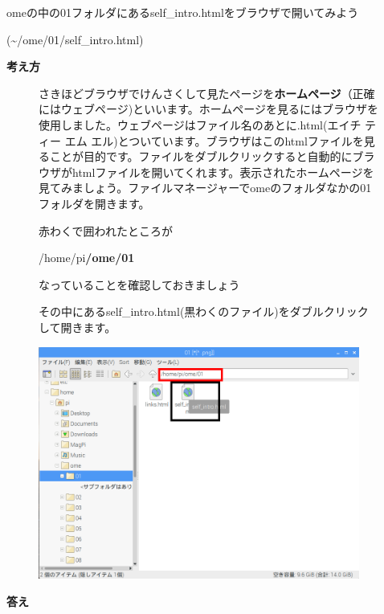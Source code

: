 \documentclass[a4paper,12pt]{jarticle}
\begin{document}
omeの中の01フォルダにあるself\_intro.htmlをブラウザで開いてみよう

(\~{}/ome/01/self\_intro.html)

\textbf{考え方}



\begin{figure}[hb]
\centering
\begin{minipage}{16.576cm}
さきほどブラウザでけんさくして見たページを\textbf{ホームページ}（正確にはウェブページ)といいます。ホームページを見るにはブラウザを使用しました。ウェブページはファイル名のあとに.html(エイチ
ティー エム
エル)とついています。ブラウザはこのhtmlファイルを見ることが目的です。ファイルをダブルクリックすると自動的にブラウザがhtmlファイルを開いてくれます。表示されたホームページを見てみましょう。ファイルマネージャーでomeのフォルダなかの01フォルダを開きます。

赤わくで囲われたところが

/home/pi\textbf{/ome/01}

なっていることを確認しておきましょう

その中にあるself\_intro.html(黒わくのファイル)をダブルクリックして開きます。




\bigskip
\end{minipage}

\includegraphics[width=10.559cm,height=7.634cm]{textbook-img141.png}

\end{figure}

\bigskip

\clearpage
\textbf{答え}
\end{document}
